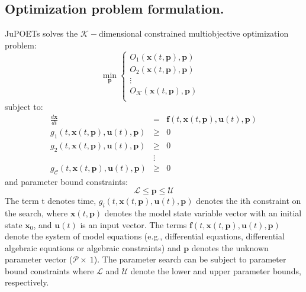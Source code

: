 \documentclass{bmcart}
\begin{document}
\subsection*{Optimization problem formulation.}
JuPOETs solves the $\mathcal{K}-$dimensional constrained multiobjective optimization problem:
\begin{equation}
\min_{\mathbf{p}}
\begin{cases}
  O_{1}\left(\mathbf{x}(t,\mathbf{p}),\mathbf{p}\right) \\
  O_{2}\left(\mathbf{x}(t,\mathbf{p}),\mathbf{p}\right) \\
  \vdots & \\
  O_{\mathcal{K}}\left(\mathbf{x}(t,\mathbf{p}),\mathbf{p}\right) \\
\end{cases}
\end{equation}
subject to:
\begin{eqnarray}\nonumber
  \frac{d\mathbf{x}}{dt} & = & \mathbf{f}(t,\mathbf{x}(t,\mathbf{p}),\mathbf{u}(t),\mathbf{p}) \\\nonumber
  g_{1}\left(t,\mathbf{x}(t,\mathbf{p}),\mathbf{u}(t),\mathbf{p}\right) &\geq& 0 \\\nonumber
  g_{2}\left(t,\mathbf{x}(t,\mathbf{p}),\mathbf{u}(t),\mathbf{p}\right) &\geq& 0 \\\nonumber
  &\vdots& \\\nonumber
  g_{\mathcal{C}}\left(t,\mathbf{x}(t,\mathbf{p}),\mathbf{u}(t),\mathbf{p}\right) &\geq& 0
\end{eqnarray}and parameter bound constraints:
\begin{equation}\nonumber
  \mathcal{L} \leq \mathbf{p} \leq \mathcal{U}
\end{equation}
The term t denotes time, $g_i\left(t,\mathbf{x}(t,\mathbf{p}),\mathbf{u}(t),\mathbf{p}\right)$ denotes the ith constraint on the search, where
$\mathbf{x}\left(t,\mathbf{p}\right)$ denotes the model state variable vector with an initial state $\mathbf{x}_{0}$, and $\mathbf{u}(t)$ is an input vector.
The terms $\mathbf{f}(t,\mathbf{x}(t,\mathbf{p}),\mathbf{u}(t),\mathbf{p})$ denote the system of model equations (e.g., differential equations,
differential algebraic equations or algebraic constraints) and $\mathbf{p}$ denotes the unknown parameter vector ($\mathcal{P}\times~1$).
The parameter search can be subject to parameter bound constraints where $\mathcal{L}$ and $\mathcal{U}$ denote the lower and upper parameter bounds, respectively.
\end{document}
